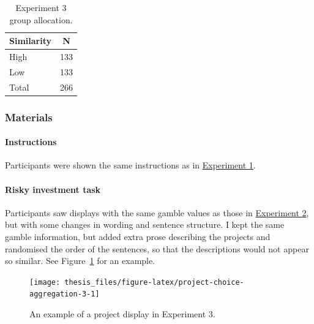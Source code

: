 \documentclass[a4paper, nobind, dvipsnames]{templates/ociamthesis}
\theoremstyle{definition}
\theoremstyle{definition}
\theoremstyle{definition}
\theoremstyle{definition}
\theoremstyle{remark}
\begin{document}
\begin{table}[tbp]

\begin{center}
\begin{threeparttable}

\caption{\label{tab:condition-allocation-aggregation-3}Experiment 3 group allocation.}

\begin{tabular}{ll}
\toprule
Similarity & \multicolumn{1}{c}{N}\\
\midrule
High & 133\\
Low & 133\\
Total & 266\\
\bottomrule
\end{tabular}

\end{threeparttable}
\end{center}

\end{table}

\hypertarget{materials-7}{%
\subsubsection{Materials}\label{materials-7}}

\hypertarget{instructions-5}{%
\paragraph{Instructions}\label{instructions-5}}

Participants were shown the same instructions as in
\protect\hyperlink{instructions-materials-aggregation-1}{Experiment 1}.

\hypertarget{task-aggregation-3}{%
\paragraph{Risky investment task}\label{task-aggregation-3}}

Participants saw displays with the same gamble values as those in
\protect\hyperlink{task-aggregation-2}{Experiment 2}, but with some changes in wording and
sentence structure. I kept the same gamble information, but added extra prose
describing the projects and randomised the order of the sentences, so that the
descriptions would not appear so similar. See
Figure~\ref{fig:project-choice-aggregation-3} for an example.



\begin{figure}
\texttt{[image: thesis\_files/figure-latex/project-choice-aggregation-3-1]} \caption{An example of a project display in Experiment 3.}\label{fig:project-choice-aggregation-3}
\end{figure}
\end{document}
